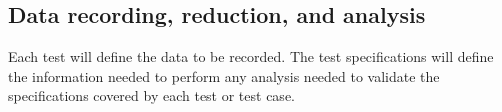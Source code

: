 \subsection{Data recording, reduction, and analysis}
\label{loc:DataRecordingReductionAndAnalysis}

Each test will define the data to be recorded.
The test specifications will define the information needed to perform any analysis needed to validate the specifications covered by each test or test case.